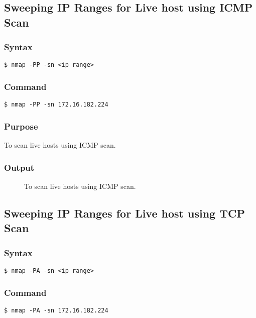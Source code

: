 \documentclass[11pt]{article}
\begin{document}
\subsection{Sweeping IP Ranges for Live host using ICMP Scan}

\subsubsection{Syntax}
\begin{verbatim}
$ nmap -PP -sn <ip range>
\end{verbatim}

\subsubsection*{Command}
\begin{verbatim}
$ nmap -PP -sn 172.16.182.224
\end{verbatim}

\subsubsection*{Purpose}
To scan live hosts using ICMP scan.

\subsubsection*{Output}
\begin{figure}[H]
    \centering
    \caption{To scan live hosts using ICMP scan.}
    \label{fig:1}
\end{figure}

\subsection{Sweeping IP Ranges for Live host using TCP Scan}

\subsubsection{Syntax}
\begin{verbatim}
$ nmap -PA -sn <ip range>
\end{verbatim}

\subsubsection*{Command}
\begin{verbatim}
$ nmap -PA -sn 172.16.182.224
\end{verbatim}
\end{document}
